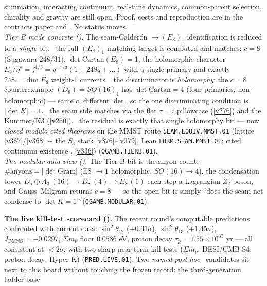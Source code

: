 \documentclass[11pt,a4paper]{article}
\begin{document}
\begin{keybox}
summation, interacting continuum, real-time dynamics, common-parent
selection, chirality and gravity are still open. Proof, costs and
reproduction are in the contracts paper and
. No status moves.
\smallskip\\
\noindent\emph{Tier B made concrete ().} The
seam-Calder\'on $\to(E_8)_1$ identification is reduced to a \emph{single} bit. \mE\ the full $(E_8)_1$ matching
target is computed and matches: $c{=}8$ (Sugawara $248/31$), $\det\mathrm{Cartan}(E_8){=}1$, the holomorphic
character $E_4/\eta^8{=}j^{1/3}{=}q^{-1/3}(1{+}248q{+}\dots)$ with a single primary and exactly $248{=}\dim E_8$
weight-1 currents. \mE\ the discriminator is \emph{holomorphy}: the $c{=}8$ counterexample
$(D_8){=}SO(16)_1$ has $\det\mathrm{Cartan}{=}4$ (four primaries, non-holomorphic) --- same $c$, different
$\det$, so the one discriminating condition is $|\det K|{=}1$. \mC\ the seam side matches via the flat
$\tau{=}i$ pillowcase (\vref{v276}) and the Kummer/K3 (\vref{v260}). \mC\ the residual is exactly that single
holomorphy bit --- now \emph{closed modulo cited theorems} on the MMST route \texttt{SEAM.EQUIV.MMST.01}
(lattice \vref{v367}/\vref{v368} $+$ the $S_3$ stack
\vref{v376}--\vref{v379}, Lean \texttt{FORM.SEAM.MMST.01}; cited continuum existence \mO, \vref{v336})
(\texttt{QGAMB.TIERB.01}).
\smallskip\\
\noindent\emph{The modular-data view ().} The Tier-B bit is the
anyon count: $\#\text{anyons}=|\det\mathrm{Gram}|$ (E8 $\to1$ holomorphic, $SO(16)\to4$), the
condensation tower $D_5{\oplus}A_3\,(16)\to D_8\,(4)\to E_8\,(1)$ each step a Lagrangian $Z_2$ boson, and
Gauss--Milgram returns $c{=}8$ --- so the open bit is simply ``does the seam net condense to $\det K{=}1$''
(\texttt{QGAMB.MODULAR.01}).
\par\smallskip\noindent\textbf{The live kill-test scorecard ().} The
recent round's computable predictions confronted with current data: $\sin^2\theta_{12}$ ($+0.31\sigma$),
$\sin^2\theta_{13}$ ($+1.45\sigma$), $J_{\mathrm{PMNS}}{=}{-}0.0297$, $\Sigma m_\nu$ floor $0.0586$ eV,
proton decay $\tau_p{=}1.55{\times}10^{35}$ yr --- all consistent at $<2\sigma$, with two sharp near-term kill
tests ($\Sigma m_\nu$: DESI/CMB-S4; proton decay: Hyper-K) (\texttt{PRED.LIVE.01}). Two \emph{named post-hoc}
\mO\ candidates sit next to this board without touching the frozen record: the third-generation ladder-base

\end{keybox}
\end{document}
